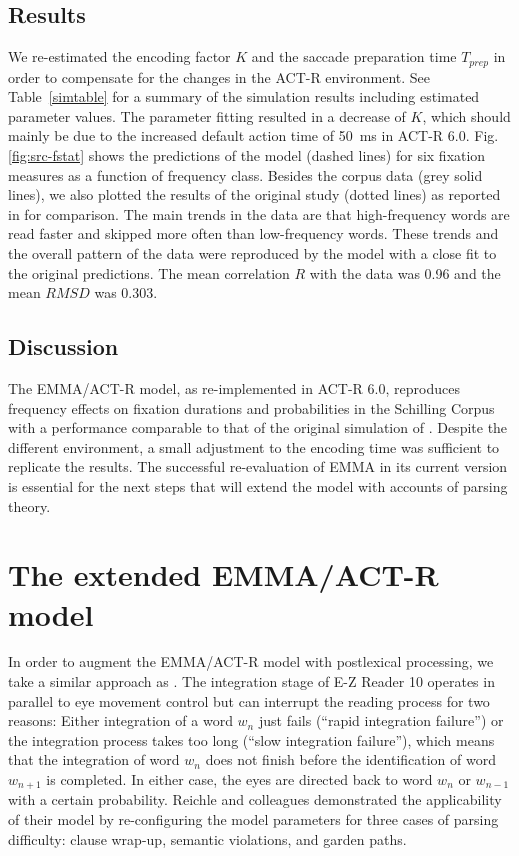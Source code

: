 \subsection{Results}
We re-estimated the encoding factor $K$ and the saccade preparation time $T_{prep}$ in order to compensate for the changes in the ACT-R environment.  See Table~\ref{simtable} for a summary of the simulation results including estimated parameter values.  
The parameter fitting resulted in a decrease of $K$, which should mainly be due to the increased default action time of 50~ms in ACT-R 6.0.
Fig. \ref{fig:src-fstat} shows the predictions of the model (dashed lines) for six fixation measures as a function of frequency class.  Besides the corpus data (grey solid lines), we also plotted the results of the original study (dotted lines) as reported in \cite{Salvucci2001} for comparison.
The main trends in the data are that high-frequency words are read faster and skipped more often than low-frequency words. These trends and the overall pattern of the data were reproduced by the model with a close fit to the original predictions. The mean correlation $R$ with the data was 0.96 and the mean $RMSD$ was 0.303.

\subsection{Discussion}
The EMMA/ACT-R model, as re-implemented in ACT-R 6.0, reproduces frequency effects on fixation durations and probabilities in the Schilling Corpus with a performance comparable to that of the original simulation of \cite{Salvucci2001}.  Despite the different environment, a small adjustment to the encoding time was sufficient to replicate the results.  
The successful re-evaluation of EMMA in its current version is essential for the next steps that will extend the model with accounts of parsing theory.

\section{The extended EMMA/ACT-R model} \label{sec:extensionemmaparser}
In order to augment the EMMA/ACT-R model with postlexical processing, we take a similar approach as \cite{ReichleWarrenMcConnell2009}.  The integration stage of E-Z Reader 10 operates in parallel to eye movement control but can interrupt the reading process for two reasons: Either integration of a word $w_n$ just fails (``rapid integration failure'') or the integration process takes too long (``slow integration failure''), which means that the integration of word $w_n$ does not finish before the identification of word $w_{n+1}$ is completed.
In either case, the eyes are directed back to word $w_n$ or $w_{n-1}$ with a certain probability.  
Reichle and colleagues demonstrated the applicability of their model by re-configuring the model parameters for three cases of parsing difficulty: clause wrap-up, semantic violations, and garden paths. 

